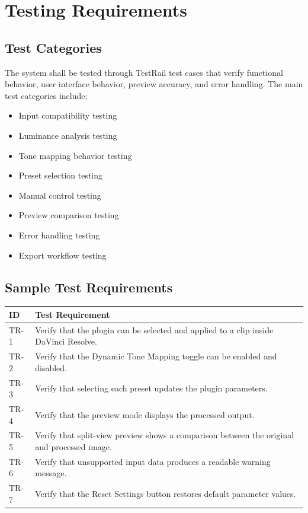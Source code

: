 \documentclass[12pt]{article}
\begin{document}
\section{Testing Requirements}

\subsection{Test Categories}
The system shall be tested through TestRail test cases that verify functional behavior, user interface behavior, preview accuracy, and error handling. The main test categories include:

\begin{itemize}
    \item Input compatibility testing
    \item Luminance analysis testing
    \item Tone mapping behavior testing
    \item Preset selection testing
    \item Manual control testing
    \item Preview comparison testing
    \item Error handling testing
    \item Export workflow testing
\end{itemize}

\subsection{Sample Test Requirements}
\begin{longtable}{|p{2.2cm}|p{12.5cm}|}
\hline
\textbf{ID} & \textbf{Test Requirement} \\
\hline
TR-1 & Verify that the plugin can be selected and applied to a clip inside DaVinci Resolve. \\
\hline
TR-2 & Verify that the Dynamic Tone Mapping toggle can be enabled and disabled. \\
\hline
TR-3 & Verify that selecting each preset updates the plugin parameters. \\
\hline
TR-4 & Verify that the preview mode displays the processed output. \\
\hline
TR-5 & Verify that split-view preview shows a comparison between the original and processed image. \\
\hline
TR-6 & Verify that unsupported input data produces a readable warning message. \\
\hline
TR-7 & Verify that the Reset Settings button restores default parameter values. \\
\hline
\end{longtable}
\end{document}
